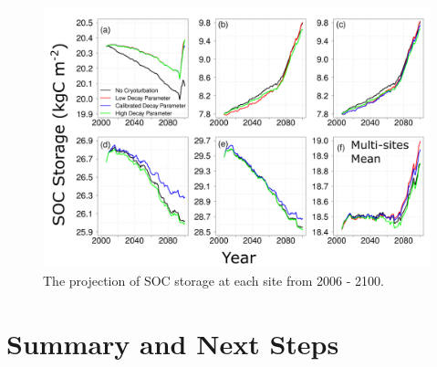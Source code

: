 \documentclass[portait,custom]{sciposter}
\begin{document}
\begin{multicols*}{4}
\begin{figure}
 \centering
 \includegraphics[width=0.9\columnwidth]{new_figures/Soil_SOC_RCP85projection.png}
 \caption{The projection of SOC storage at each site from 2006 - 2100.}\label{fig:2005_drought} 
\end{figure}


\vskip-0.25in
\section*{Summary and Next Steps}


\end{multicols*}
\end{document}
